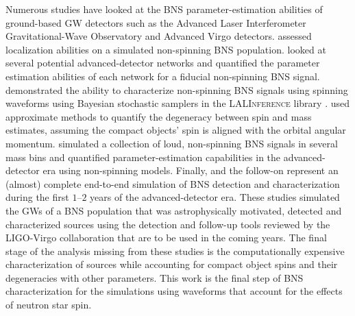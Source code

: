 Numerous studies have looked at the BNS parameter-estimation abilities of ground-based GW detectors such as the Advanced Laser Interferometer Gravitational-Wave Observatory \citep[aLIGO;][]{Aasi_2015} and Advanced Virgo \citep[AdV;][]{Acernese_2014} detectors. \citet{Nissanke_2010,Nissanke_2011} assessed localization abilities on a simulated non-spinning BNS population. \citet{Veitch_2012} looked at several potential advanced-detector networks and quantified the parameter estimation abilities of each network for a fiducial non-spinning BNS signal. \citet{Aasi_2013} demonstrated the ability to characterize non-spinning BNS signals using spinning waveforms using Bayesian stochastic samplers in the \textsc{LALInference} library \citep{Veitch_2014}.  \citet{Hannam_2013} used approximate methods to quantify the degeneracy between spin and mass estimates, assuming the compact objects' spin is aligned with the orbital angular momentum. \citet{Rodriguez_2014} simulated a collection of loud, non-spinning BNS signals in several mass bins and quantified parameter-estimation capabilities in the advanced-detector era using non-spinning models.  Finally, \citet{Singer_2014} and the follow-on \citet{Berry_2014} represent an (almost) complete end-to-end simulation of BNS detection and characterization during the first $1$--$2$ years of the advanced-detector era. These studies simulated the GWs of a BNS population that was astrophysically motivated, detected and characterized sources using the detection and follow-up tools reviewed by the LIGO-Virgo collaboration that are to be used in the coming years.   The final stage of the analysis missing from these studies is the computationally expensive characterization of sources while accounting for compact object spins and their degeneracies with other parameters.  This work is the final step of BNS characterization for the \citet{Singer_2014} simulations using waveforms that account for the effects of neutron star spin.